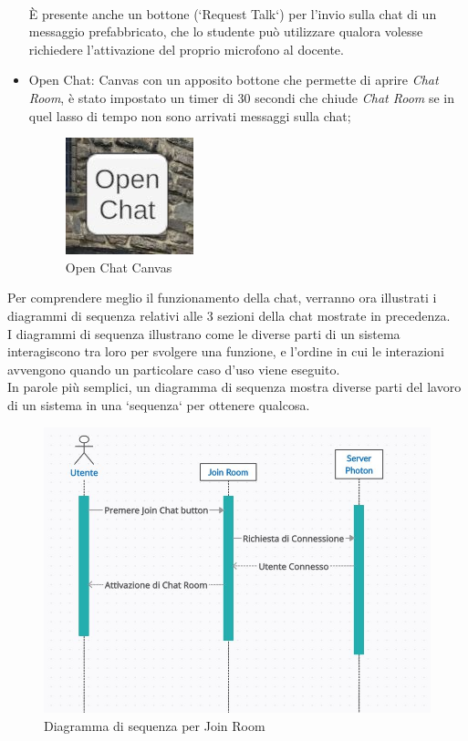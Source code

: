 \begin{itemize}
    \\È presente anche un bottone (`Request Talk`) per l'invio sulla chat di un messaggio prefabbricato, che lo studente può utilizzare qualora volesse richiedere l'attivazione del proprio microfono al docente. 
    \item Open Chat: Canvas con un apposito bottone che permette di aprire \textit{Chat Room}, è stato impostato un timer di 30 secondi che chiude \textit{Chat Room} se in quel lasso di tempo non sono arrivati messaggi sulla chat;
    \begin{figure}[H]
    \centering
    \includegraphics[scale = 0.65]{Immagini/Openchat.jpg}
    \caption{Open Chat Canvas}
    \label{fig:my_label}
\end{figure}
\end{itemize}
Per comprendere meglio il funzionamento della chat, verranno ora illustrati i diagrammi di sequenza relativi alle 3 sezioni della chat mostrate in precedenza.
\\I diagrammi di sequenza illustrano come le diverse parti di un sistema interagiscono tra loro per svolgere una funzione, e l'ordine in cui le interazioni avvengono quando un particolare caso d'uso viene eseguito.
\\In parole più semplici, un diagramma di sequenza mostra diverse parti del lavoro di un sistema in una `sequenza` per ottenere qualcosa.
\begin{figure}[H]
    \centering
    \includegraphics[scale = 0.65]{Immagini/ChatBackgrounddiagramma.jpg}
    \caption{Diagramma di sequenza per Join Room}
    \label{fig:my_label}
    \end{figure}
